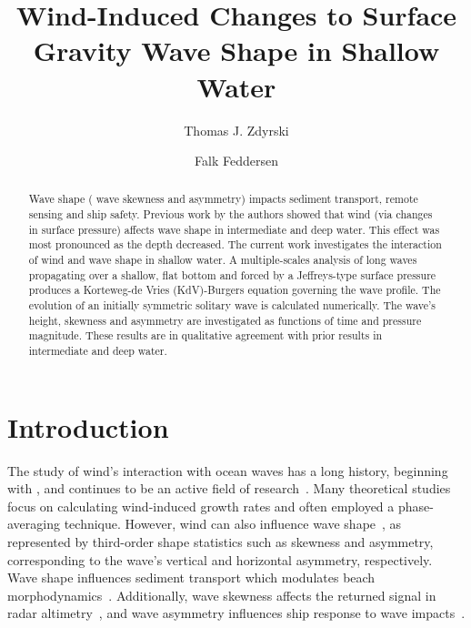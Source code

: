\documentclass{jfm}
\title{Wind-Induced Changes to Surface Gravity Wave Shape in Shallow Water}
\author{Thomas J. Zdyrski \and Falk Feddersen}
\begin{document}
\maketitle

\begin{abstract}
Wave shape (\eg{} wave skewness and asymmetry) impacts sediment
transport, remote sensing and ship safety.
Previous work by the authors showed that wind (via changes in surface
pressure) affects wave shape in intermediate and deep water.
This effect was most pronounced as the depth decreased.
The current work investigates the interaction of wind and wave shape in
shallow water.
A multiple-scales analysis of long waves propagating over a shallow,
flat bottom and forced by a Jeffreys-type surface pressure produces a
Korteweg-de Vries (KdV)-Burgers equation governing the wave profile.
The evolution of an initially symmetric solitary wave is calculated
numerically.
The wave's height, skewness and asymmetry are investigated as functions
of time and pressure magnitude.
These results are in qualitative agreement with prior results in
intermediate and deep water.
\end{abstract}

\section{Introduction}

The study of wind's interaction with ocean waves has a long history, beginning
with \citet{jeffreys1925formation}, and continues to be an active field
of
research~\citep[\eg][]{janssen1991quasi,donelan2004limiting,sulivan2010dynamics}.
Many theoretical
studies~\citep[\eg][]{jeffreys1925formation,miles1957generation,phillips1957generation}
focus on calculating wind-induced growth rates and often employed a
phase-averaging technique.
However, wind can also influence wave
shape~\citep[\eg][]{leykin1995asymmetry,feddersen2005wind,zdyrski2020wind},
as represented by third-order shape statistics such as skewness and
asymmetry, corresponding to the wave's vertical and horizontal
asymmetry, respectively.
Wave shape influences sediment transport
\citep[\eg][]{drake2001discrete} which modulates
beach morphodynamics~\citep[\eg][]{hoefel2003wave}.
Additionally, wave skewness affects the returned signal in radar
altimetry~\citep[\eg][]{hayne1980radar},
and wave asymmetry influences ship response to wave
impacts~\citep[\eg][]{soares2008abnormal}.
\end{document}
